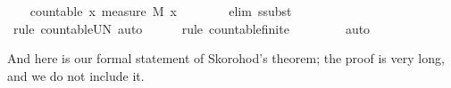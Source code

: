 \documentclass{article}
\theoremstyle{definition}
\begin{document}
\begin{isabellebody}
\ \ \isamarkupfalse%
\ {\isachardoublequoteopen}countable\ {\isacharbraceleft}x{\isachardot}\ measure\ M\ {\isacharbraceleft}x{\isacharbraceright}\ {\isachargreater}\ {}{\isacharbraceright}{\isachardoublequoteclose}\isanewline
\ \ \ \ \isamarkupfalse%
\ {\isacharparenleft}elim\ ssubst{\isacharparenright}\isanewline
\ \ \ \ \isamarkupfalse%
\ {\isacharparenleft}rule\ countable{\isacharunderscore}UN{\isacharcomma}\ auto{\isacharparenright}\isanewline
\ \ \ \ \isamarkupfalse%
\ {\isacharparenleft}rule\ countable{\isacharunderscore}finite{\isacharparenright}\isanewline
\ \ \ \ \isamarkupfalse%
\ {\isacharasterisk}{\isacharasterisk}\ \isamarkupfalse%
\ auto\isanewline
{}\isamarkupfalse%
\end{isabellebody}

\medskip

And here is our formal statement of Skorohod's theorem; the proof is very long, and we do not include it.

\medskip
\end{document}
